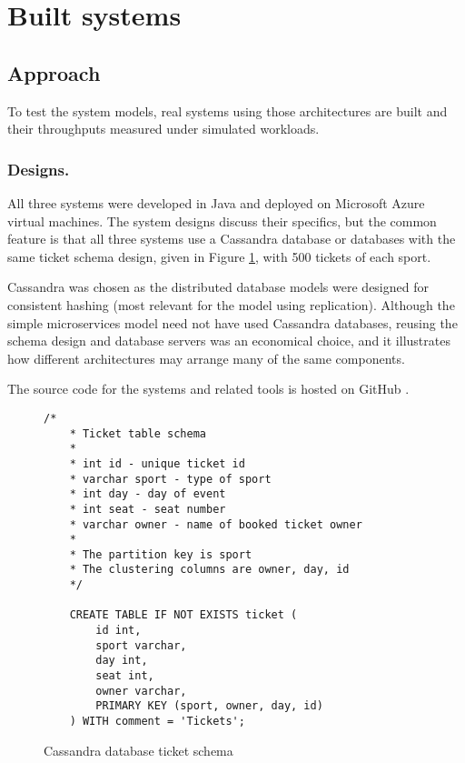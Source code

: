 %
%

\section{Built systems}\label{sec:built-systems}

\subsection{Approach}

To test the system models, real systems using those architectures are built and their throughputs measured under simulated workloads.

\subsubsection{Designs.}  All three systems were developed in Java and deployed on Microsoft Azure virtual machines.  The system designs discuss their specifics, but the common feature is that all three systems use a Cassandra database or databases with the same ticket schema design, given in Figure \ref{figure:cassandra_ticket_schema}, with 500 tickets of each sport.

Cassandra was chosen as the distributed database models were designed for consistent hashing (most relevant for the model using replication).  Although the simple microservices model need not have used Cassandra databases, reusing the schema design and database servers was an economical choice, and it illustrates how different architectures may arrange many of the same components.

The source code for the systems and related tools is hosted on GitHub \cite{RN1073}.

\begin{figure}
	\label{figure:cassandra_ticket_schema}
	\centering
	\begin{lstlisting}[basicstyle=\ttfamily]
	/*
	* Ticket table schema
	* 
	* int id - unique ticket id
	* varchar sport - type of sport
	* int day - day of event
	* int seat - seat number
	* varchar owner - name of booked ticket owner
	* 
	* The partition key is sport
	* The clustering columns are owner, day, id
	*/
	
	CREATE TABLE IF NOT EXISTS ticket (
		id int,
		sport varchar,
		day int,
		seat int,
		owner varchar,
		PRIMARY KEY (sport, owner, day, id)
	) WITH comment = 'Tickets';
	\end{lstlisting}
	\caption{Cassandra database ticket schema}
\end{figure}

